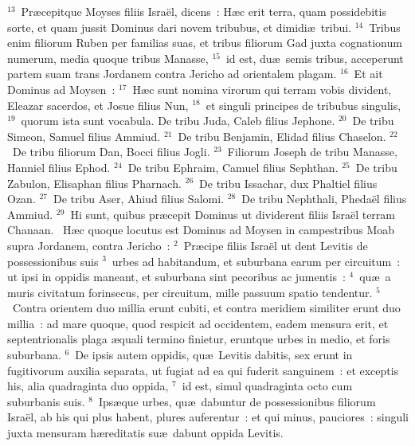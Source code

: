 ${}^{13}$~Pr\ae cepitque Moyses filiis Isra\"el, dicens~: H\ae c erit terra, quam possidebitis sorte, et quam jussit Dominus dari novem tribubus, et dimidi\ae\ tribui.
${}^{14}$~Tribus enim filiorum Ruben per familias suas, et tribus filiorum Gad juxta cognationum numerum, media quoque tribus Manasse,
${}^{15}$~id est, du\ae\ semis tribus, acceperunt partem suam trans Jordanem contra Jericho ad orientalem plagam.
${}^{16}$~Et ait Dominus ad Moysen~:
${}^{17}$~H\ae c sunt nomina virorum qui terram vobis divident, Eleazar sacerdos, et Josue filius Nun,
${}^{18}$~et singuli principes de tribubus singulis,
${}^{19}$~quorum ista sunt vocabula. De tribu Juda, Caleb filius Jephone.
${}^{20}$~De tribu Simeon, Samuel filius Ammiud.
${}^{21}$~De tribu Benjamin, Elidad filius Chaselon.
${}^{22}$~De tribu filiorum Dan, Bocci filius Jogli.
${}^{23}$~Filiorum Joseph de tribu Manasse, Hanniel filius Ephod.
${}^{24}$~De tribu Ephraim, Camuel filius Sephthan.
${}^{25}$~De tribu Zabulon, Elisaphan filius Pharnach.
${}^{26}$~De tribu Issachar, dux Phaltiel filius Ozan.
${}^{27}$~De tribu Aser, Ahiud filius Salomi.
${}^{28}$~De tribu Nephthali, Pheda\"el filius Ammiud.
${}^{29}$~Hi sunt, quibus pr\ae cepit Dominus ut dividerent filiis Isra\"el terram Chanaan.
~H\ae c quoque locutus est Dominus ad Moysen in campestribus Moab supra Jordanem, contra Jericho~:
${}^{2}$~Pr\ae cipe filiis Isra\"el ut dent Levitis de possessionibus suis
${}^{3}$~urbes ad habitandum, et suburbana earum per circuitum~: ut ipsi in oppidis maneant, et suburbana sint pecoribus ac jumentis~:
${}^{4}$~qu\ae\ a muris civitatum forinsecus, per circuitum, mille passuum spatio tendentur.
${}^{5}$~Contra orientem duo millia erunt cubiti, et contra meridiem similiter erunt duo millia~: ad mare quoque, quod respicit ad occidentem, eadem mensura erit, et septentrionalis plaga \ae quali termino finietur, eruntque urbes in medio, et foris suburbana.
${}^{6}$~De ipsis autem oppidis, qu\ae\ Levitis dabitis, sex erunt in fugitivorum auxilia separata, ut fugiat ad ea qui fuderit sanguinem~: et exceptis his, alia quadraginta duo oppida,
${}^{7}$~id est, simul quadraginta octo cum suburbanis suis.
${}^{8}$~Ips\ae que urbes, qu\ae\ dabuntur de possessionibus filiorum Isra\"el, ab his qui plus habent, plures auferentur~: et qui minus, pauciores~: singuli juxta mensuram h\ae reditatis su\ae\ dabunt oppida Levitis.


